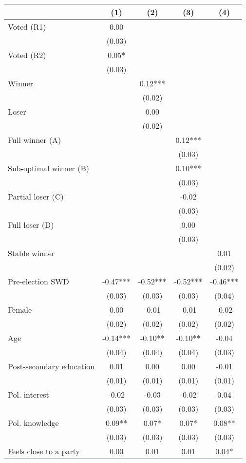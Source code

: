 \begin{table}
\centering
\begin{tabular}[t]{lcccc}
\toprule
  & (1) & (2) & (3) & (4)\\
\midrule
Voted (R1) & 0.00 &  &  & \\
 & (0.03) &  &  \vphantom{1} & \\
Voted (R2) & 0.05* &  &  & \\
 & (0.03) &  &  & \\
Winner &  & 0.12*** &  & \\
 &  & (0.02) &  \vphantom{1} & \\
Loser &  & 0.00 &  & \\
 &  & (0.02) &  & \\
Full winner (A) &  &  & 0.12*** & \\
 &  &  & (0.03) \vphantom{3} & \\
Sub-optimal winner (B) &  &  & 0.10*** & \\
 &  &  & (0.03) \vphantom{2} & \\
Partial loser (C) &  &  & -0.02 & \\
 &  &  & (0.03) \vphantom{1} & \\
Full loser (D) &  &  & 0.00 & \\
 &  &  & (0.03) & \\
Stable winner &  &  &  & 0.01\\
 &  &  &  & (0.02)\\
Pre-election SWD & -0.47*** & -0.52*** & -0.52*** & -0.46***\\
 & (0.03) & (0.03) & (0.03) & (0.04)\\
Female & 0.00 & -0.01 & -0.01 & -0.02\\
 & (0.02) & (0.02) & (0.02) & \vphantom{4} (0.02)\\
Age & -0.14*** & -0.10** & -0.10** & -0.04\\
 & (0.04) & (0.04) & (0.04) & (0.03)\\
Post-secondary education & 0.01 & 0.00 & 0.00 & -0.01\\
 & (0.01) & (0.01) & (0.01) & (0.01)\\
Pol. interest & -0.02 & -0.03 & -0.02 & 0.04\\
 & (0.03) & (0.03) & (0.03) & \vphantom{1} (0.03)\\
Pol. knowledge & 0.09** & 0.07* & 0.07* & 0.08**\\
 & (0.03) & (0.03) & (0.03) & (0.03)\\
Feels close to a party & 0.00 & 0.01 & 0.01 & 0.04*\\

\end{tabular}
\end{table}
